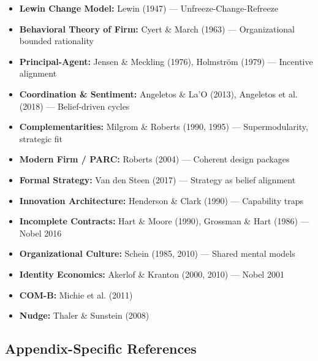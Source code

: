 \begin{itemize}[nosep]
\item \textbf{Lewin Change Model:} Lewin (1947) --- Unfreeze-Change-Refreeze
\item \textbf{Behavioral Theory of Firm:} Cyert \& March (1963) --- Organizational bounded rationality
\item \textbf{Principal-Agent:} Jensen \& Meckling (1976), Holmström (1979) --- Incentive alignment
\item \textbf{Coordination \& Sentiment:} Angeletos \& La'O (2013), Angeletos et al. (2018) --- Belief-driven cycles
\item \textbf{Complementarities:} Milgrom \& Roberts (1990, 1995) --- Supermodularity, strategic fit
\item \textbf{Modern Firm / PARC:} Roberts (2004) --- Coherent design packages
\item \textbf{Formal Strategy:} Van den Steen (2017) --- Strategy as belief alignment
\item \textbf{Innovation Architecture:} Henderson \& Clark (1990) --- Capability traps
\item \textbf{Incomplete Contracts:} Hart \& Moore (1990), Grossman \& Hart (1986) --- Nobel 2016
\item \textbf{Organizational Culture:} Schein (1985, 2010) --- Shared mental models
\item \textbf{Identity Economics:} Akerlof \& Kranton (2000, 2010) --- Nobel 2001
\item \textbf{COM-B:} Michie et al. (2011)
\item \textbf{Nudge:} Thaler \& Sunstein (2008)
\end{itemize}

\subsection{Appendix-Specific References}

